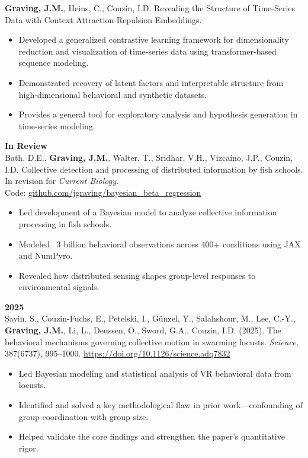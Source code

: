 \documentclass[10pt,letterpaper]{article}
\begin{document}
	\textbf{Graving, J.M.}, Heins, C., Couzin, I.D. Revealing the Structure of Time-Series Data with Context Attraction-Repulsion Embeddings.
	\begin{itemize}
		\item Developed a generalized contrastive learning framework for dimensionality reduction and visualization of time-series data using transformer-based sequence modeling.
		\item Demonstrated recovery of latent factors and interpretable structure from high-dimensional behavioral and synthetic datasets.
		\item Provides a general tool for exploratory analysis and hypothesis generation in time-series modeling.
	\end{itemize}
	
	\vspace{4pt}
	\textbf{In Review}\\
	Bath, D.E., \textbf{Graving, J.M.}, Walter, T., Sridhar, V.H., Vizcaíno, J.P., Couzin, I.D. Collective detection and processing of distributed information by fish schools. In revision for \textit{Current Biology}. \\ Code: \href{https://github.com/jgraving/bayesian_beta_regression}{github.com/jgraving/bayesian\_beta\_regression}
	\begin{itemize}
		\item Led development of a Bayesian model to analyze collective information processing in fish schools.
		\item Modeled ~3 billion behavioral observations across 400+ conditions using JAX and NumPyro.
		\item Revealed how distributed sensing shapes group-level responses to environmental signals.
	\end{itemize}
	
	\vspace{4pt}
	\textbf{2025}\\
	Sayin, S., Couzin-Fuchs, E., Petelski, I., G\"unzel, Y., Salahshour, M., Lee, C.-Y., \textbf{Graving, J.M.}, Li, L., Deussen, O., Sword, G.A., Couzin, I.D. (2025). The behavioral mechanisms governing collective motion in swarming locusts. \textit{Science}, 387(6737), 995–1000. \href{https://doi.org/10.1126/science.adq7832}{https://doi.org/10.1126/science.adq7832}
	\begin{itemize}
		\item Led Bayesian modeling and statistical analysis of VR behavioral data from locusts.
		\item Identified and solved a key methodological flaw in prior work—confounding of group coordination with group size.
		\item Helped validate the core findings and strengthen the paper's quantitative rigor.
	\end{itemize}
	
\end{document}
